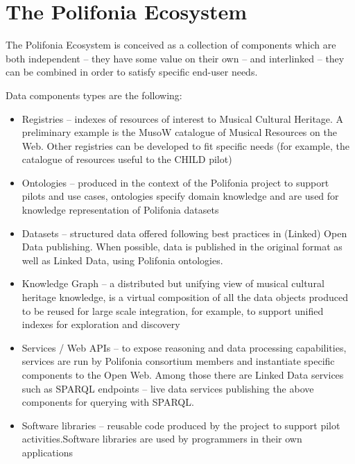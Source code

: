 \chapter{The Polifonia Ecosystem}\label{ch:ecosystem}


The Polifonia Ecosystem is conceived as a collection of components which are both independent -- they have some value on their own -- and interlinked -- they can be combined in order to satisfy specific end-user needs.

Data components types are the following:
\begin{itemize}
\item Registries -- indexes of resources of interest to Musical Cultural Heritage. A preliminary example is the MusoW catalogue of Musical Resources on the Web. Other registries can be developed to fit specific needs (for example, the catalogue of resources useful to the CHILD pilot)
\item Ontologies -- produced in the context of the Polifonia project to support pilots and use cases, ontologies specify domain knowledge and are used for knowledge representation of Polifonia datasets
\item Datasets -- structured data offered following best practices in (Linked) Open Data publishing. When possible, data is published in the original format as well as Linked Data, using Polifonia ontologies.
\item Knowledge Graph -- a distributed but unifying view of musical cultural heritage knowledge, is a virtual composition of all the data objects produced to be reused for large scale integration, for example, to support unified indexes for exploration and discovery
\item Services / Web APIs -- to expose reasoning and data processing capabilities, services are run by Polifonia consortium members and instantiate specific components to the Open Web. %
Among those there are Linked Data services such as SPARQL endpoints -- live data services publishing the above components for querying with SPARQL.
\item Software libraries -- reusable code produced by the project to support pilot activities.Software libraries are used by programmers in their own applications

\end{itemize}
